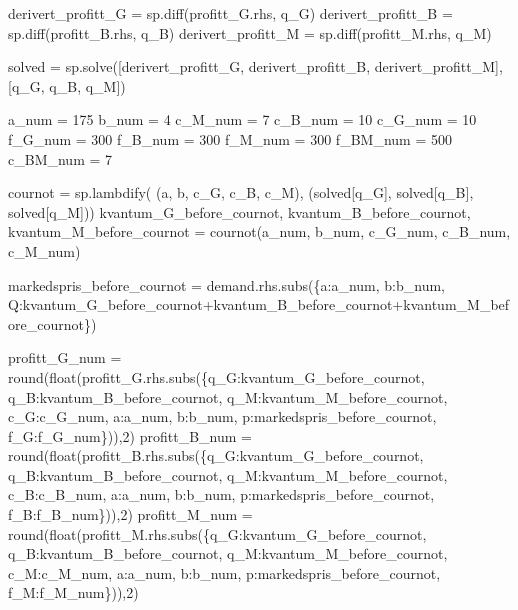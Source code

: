 \documentclass[
  12pt,
  a4paper,
  DIV=11,
  numbers=noendperiod]{scrartcl}
\newenvironment{Shaded}{\begin{snugshade}}{\end{snugshade}}
\newcommand{\BuiltInTok}[1]{\textcolor[rgb]{0.00,0.23,0.31}{#1}}
\newcommand{\DecValTok}[1]{\textcolor[rgb]{0.68,0.00,0.00}{#1}}
\newcommand{\NormalTok}[1]{\textcolor[rgb]{0.00,0.23,0.31}{#1}}
\newcommand{\OperatorTok}[1]{\textcolor[rgb]{0.37,0.37,0.37}{#1}}
\begin{document}
\begin{Shaded}
\begin{Highlighting}[]
\NormalTok{derivert\_profitt\_G }\OperatorTok{=}\NormalTok{ sp.diff(profitt\_G.rhs, q\_G)}
\NormalTok{derivert\_profitt\_B }\OperatorTok{=}\NormalTok{ sp.diff(profitt\_B.rhs, q\_B)}
\NormalTok{derivert\_profitt\_M }\OperatorTok{=}\NormalTok{ sp.diff(profitt\_M.rhs, q\_M)}

\NormalTok{solved }\OperatorTok{=}\NormalTok{ sp.solve([derivert\_profitt\_G, derivert\_profitt\_B, derivert\_profitt\_M], [q\_G, q\_B, q\_M])}
\end{Highlighting}
\end{Shaded}

\begin{Shaded}
\begin{Highlighting}[]
\NormalTok{a\_num }\OperatorTok{=} \DecValTok{175}
\NormalTok{b\_num }\OperatorTok{=} \DecValTok{4}
\NormalTok{c\_M\_num }\OperatorTok{=} \DecValTok{7}
\NormalTok{c\_B\_num }\OperatorTok{=} \DecValTok{10}
\NormalTok{c\_G\_num }\OperatorTok{=} \DecValTok{10}
\NormalTok{f\_G\_num }\OperatorTok{=} \DecValTok{300}
\NormalTok{f\_B\_num }\OperatorTok{=} \DecValTok{300}
\NormalTok{f\_M\_num }\OperatorTok{=} \DecValTok{300}
\NormalTok{f\_BM\_num }\OperatorTok{=} \DecValTok{500}
\NormalTok{c\_BM\_num }\OperatorTok{=} \DecValTok{7}

\NormalTok{cournot }\OperatorTok{=}\NormalTok{ sp.lambdify(}
\NormalTok{    (a, b, c\_G, c\_B, c\_M), }
\NormalTok{    (solved[q\_G], solved[q\_B], solved[q\_M]))}
\NormalTok{kvantum\_G\_before\_cournot, kvantum\_B\_before\_cournot, kvantum\_M\_before\_cournot }\OperatorTok{=}\NormalTok{ cournot(a\_num, b\_num, c\_G\_num, c\_B\_num, c\_M\_num)}

\NormalTok{markedspris\_before\_cournot }\OperatorTok{=}\NormalTok{ demand.rhs.subs(\{a:a\_num, b:b\_num, Q:kvantum\_G\_before\_cournot}\OperatorTok{+}\NormalTok{kvantum\_B\_before\_cournot}\OperatorTok{+}\NormalTok{kvantum\_M\_before\_cournot\})}

\NormalTok{profitt\_G\_num }\OperatorTok{=} \BuiltInTok{round}\NormalTok{(}\BuiltInTok{float}\NormalTok{(profitt\_G.rhs.subs(\{q\_G:kvantum\_G\_before\_cournot, q\_B:kvantum\_B\_before\_cournot, q\_M:kvantum\_M\_before\_cournot, c\_G:c\_G\_num, a:a\_num, b:b\_num, p:markedspris\_before\_cournot, f\_G:f\_G\_num\})),}\DecValTok{2}\NormalTok{)}
\NormalTok{profitt\_B\_num }\OperatorTok{=} \BuiltInTok{round}\NormalTok{(}\BuiltInTok{float}\NormalTok{(profitt\_B.rhs.subs(\{q\_G:kvantum\_G\_before\_cournot, q\_B:kvantum\_B\_before\_cournot, q\_M:kvantum\_M\_before\_cournot, c\_B:c\_B\_num, a:a\_num, b:b\_num, p:markedspris\_before\_cournot, f\_B:f\_B\_num\})),}\DecValTok{2}\NormalTok{)}
\NormalTok{profitt\_M\_num }\OperatorTok{=} \BuiltInTok{round}\NormalTok{(}\BuiltInTok{float}\NormalTok{(profitt\_M.rhs.subs(\{q\_G:kvantum\_G\_before\_cournot, q\_B:kvantum\_B\_before\_cournot, q\_M:kvantum\_M\_before\_cournot, c\_M:c\_M\_num, a:a\_num, b:b\_num, p:markedspris\_before\_cournot, f\_M:f\_M\_num\})),}\DecValTok{2}\NormalTok{)}
\end{Highlighting}
\end{Shaded}
\end{document}

